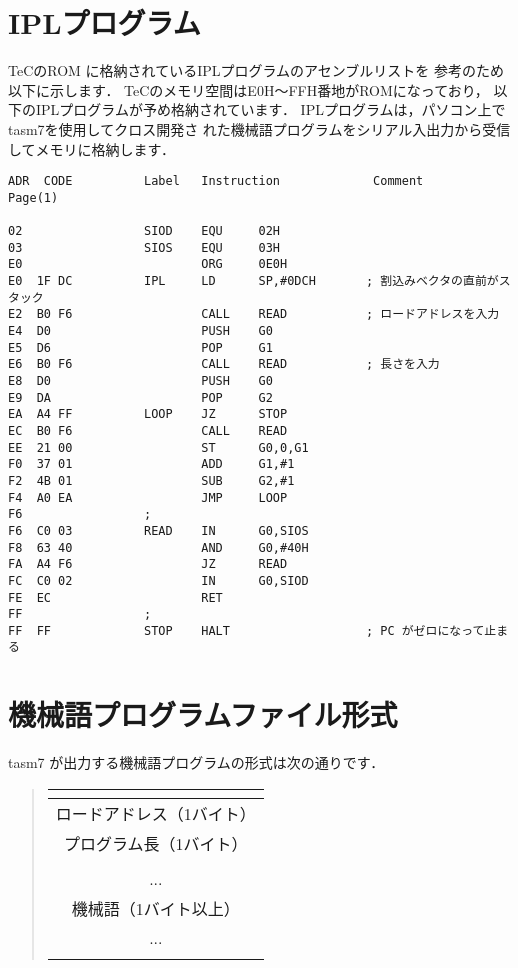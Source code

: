 \newpage
\section{IPLプログラム}\label{iplsrc}
TeCのROM に格納されているIPLプログラムのアセンブルリストを
参考のため以下に示します．
TeCのメモリ空間はE0H〜FFH番地がROMになっており，
以下のIPLプログラムが予め格納されています．
IPLプログラムは，パソコン上でtasm7を使用してクロス開発さ
れた機械語プログラムをシリアル入出力から受信してメモリに格納します．

\begin{center}
\begin{verbatim}
ADR  CODE          Label   Instruction             Comment              Page(1)

02                 SIOD    EQU     02H            
03                 SIOS    EQU     03H            
E0                         ORG     0E0H           
E0  1F DC          IPL     LD      SP,#0DCH       ; 割込みベクタの直前がスタック
E2  B0 F6                  CALL    READ           ; ロードアドレスを入力
E4  D0                     PUSH    G0             
E5  D6                     POP     G1             
E6  B0 F6                  CALL    READ           ; 長さを入力
E8  D0                     PUSH    G0             
E9  DA                     POP     G2             
EA  A4 FF          LOOP    JZ      STOP           
EC  B0 F6                  CALL    READ           
EE  21 00                  ST      G0,0,G1        
F0  37 01                  ADD     G1,#1          
F2  4B 01                  SUB     G2,#1          
F4  A0 EA                  JMP     LOOP           
F6                 ;
F6  C0 03          READ    IN      G0,SIOS        
F8  63 40                  AND     G0,#40H        
FA  A4 F6                  JZ      READ           
FC  C0 02                  IN      G0,SIOD        
FE  EC                     RET                    
FF                 ;
FF  FF             STOP    HALT                   ; PC がゼロになって止まる
\end{verbatim}
\end{center}

\newpage
\section{機械語プログラムファイル形式}
tasm7 が出力する機械語プログラムの形式は次の通りです．

\begin{quote}
{\small\bf\begin{tabular}{|c|}
\multicolumn{1}{c}{}\\
\hline
ロードアドレス（1バイト） \\
\hline
プログラム長（1バイト） \\
\hline
\\
...\\
機械語（1バイト以上） \\
...\\
\\
\hline
\end{tabular}}
\end{quote}
